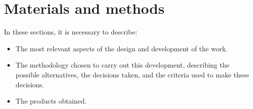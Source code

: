 \chapter{Materials and methods}
In these sections, it is necessary to describe:
\begin{itemize}
    \item The most relevant aspects of the design and development of the work.
    \item The methodology chosen to carry out this development, describing the possible alternatives, the decisions taken, and the criteria used to make these decisions.
    \item The products obtained.
\end{itemize}
